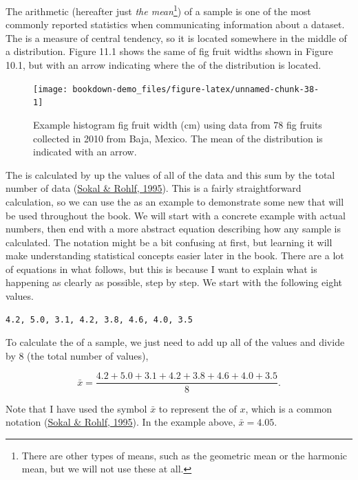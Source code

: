 \documentclass[
  openany]{krantz}
\begin{document}
The arithmetic  (hereafter just \emph{the mean}\footnote{There are other types of means, such as the geometric mean or the harmonic mean, but we will not use these at all.}) of a sample is one of the most commonly reported statistics when communicating information about a dataset.
The  is a measure of central tendency, so it is located somewhere in the middle of a distribution.
Figure 11.1 shows the same  of fig fruit widths shown in Figure 10.1, but with an arrow indicating where the  of the distribution is located.

\begin{figure}
\texttt{[image: bookdown-demo\_files/figure-latex/unnamed-chunk-38-1]} \caption{Example histogram fig fruit width (cm) using data from 78 fig fruits collected in 2010 from Baja, Mexico. The mean of the distribution is indicated with an arrow.}\label{fig:unnamed-chunk-38}
\end{figure}

The  is calculated by  up the values of all of the data and  this sum by the total number of data (\protect\hyperlink{ref-Sokal1995}{Sokal \& Rohlf, 1995}).
This is a fairly straightforward calculation, so we can use the  as an example to demonstrate some new  that will be used throughout the book.
We will start with a concrete example with actual numbers, then end with a more abstract equation describing how any sample  is calculated.
The notation might be a bit confusing at first, but learning it will make understanding statistical concepts easier later in the book.
There are a lot of equations in what follows, but this is because I want to explain what is happening as clearly as possible, step by step.
We start with the following eight values.

\begin{verbatim}
4.2, 5.0, 3.1, 4.2, 3.8, 4.6, 4.0, 3.5
\end{verbatim}

To calculate the  of a sample, we just need to add up all of the values and divide by 8 (the total number of values),

\[\bar{x} = \frac{4.2 + 5.0 + 3.1 + 4.2 + 3.8 + 4.6 + 4.0 + 3.5}{8}.\]

Note that I have used the symbol \(\bar{x}\) to represent the  of \(x\), which is a common notation (\protect\hyperlink{ref-Sokal1995}{Sokal \& Rohlf, 1995}).
In the example above, \(\bar{x} = 4.05\).
\end{document}
